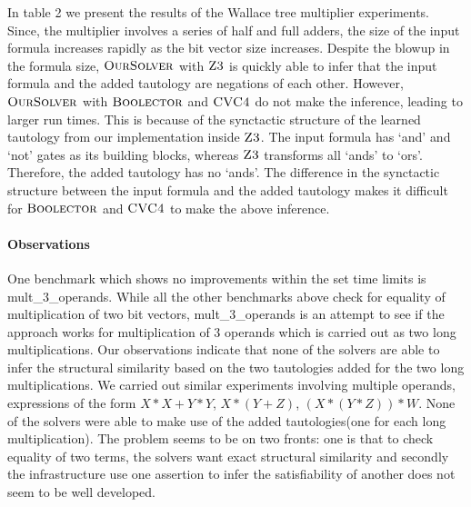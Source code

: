 

In table 2 we present the results of the Wallace tree multiplier experiments. Since, the multiplier involves a series of half and full adders, the size of the input formula increases rapidly as the bit vector size increases. Despite the blowup in the formula size, $\textsc{OurSolver}$ with $\textsc{Z3}$ is quickly able to infer that the input formula and the added tautology are negations of each other. However, $\textsc{OurSolver}$ with $\textsc{Boolector}$ and $\textsc{CVC4}$ do not make the inference, leading to larger run times. This is because of the synctactic structure of the learned tautology from our implementation inside $\textsc{Z3}$. The input formula has `and' and `not' gates as its building blocks, whereas $\textsc{Z3}$ transforms all `ands' to `ors'. Therefore, the added tautology has no `ands'. The difference in the synctactic structure between the input formula and the added tautology makes it difficult for $\textsc{Boolector}$ and $\textsc{CVC4}$ to make the above inference. 


%
\paragraph{\bf Observations}
%
One benchmark which shows no improvements within the set time limits is mult\_3\_operands. While all the other benchmarks above check for equality of multiplication of two bit vectors, mult\_3\_operands is an attempt to see if the approach works for multiplication of 3 operands which is carried out as two long multiplications. Our observations indicate that none of the solvers are able to infer the structural similarity based on the two tautologies added for the two long multiplications. We carried out similar experiments involving multiple operands, expressions of the form $X*X + Y*Y$, $X*(Y+Z)$, $(X*(Y*Z))*W$. None of the solvers were able to make use of the added tautologies(one for each long multiplication). The problem seems to be on two fronts: one is that to check equality of two terms, the solvers want exact structural similarity and secondly the infrastructure use one assertion to infer the satisfiability of another does not seem to be well developed. 







